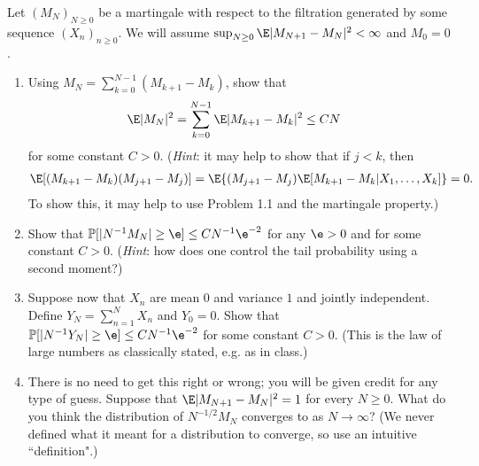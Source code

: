 \documentclass[12pt,reqno]{amsart}
\theoremstyle{definition}
\theoremstyle{remark}
\numberwithin{equation}{section}
\begin{document}
Let $(M_{N})_{N\geq0}$ be a martingale with respect to the filtration generated by some sequence $(X_{n})_{n\geq0}$. We will assume $\sup_{N\geq0}\E|M_{N+1}-M_{N}|^{2}<\infty$ and $M_{0}=0$.
\begin{enumerate}
\item Using $M_{N}=\sum_{k=0}^{N-1}(M_{k+1}-M_{k})$, show that 
%
\begin{align*}
\E|M_{N}|^{2}&=\sum_{k=0}^{N-1}\E|M_{k+1}-M_{k}|^{2}\leq CN
\end{align*}
%
for some constant $C>0$. (\emph{Hint}: it may help to show that if $j<k$, then 
%
\begin{align*}
\E[(M_{k+1}-M_{k})(M_{j+1}-M_{j})]=\E\{(M_{j+1}-M_{j})\E[M_{k+1}-M_{k}|X_{1},\ldots,X_{k}]\}=0.
\end{align*}
%
To show this, it may help to use Problem 1.1 and the martingale property.)
\item Show that $\mathbb{P}[|N^{-1}M_{N}|\geq\e]\leq CN^{-1}\e^{-2}$ for any $\e>0$ and for some constant $C>0$. (\emph{Hint}: how does one control the tail probability using a second moment?)
\item Suppose now that $X_{n}$ are mean $0$ and variance $1$ {\color{red}and jointly independent}. Define $Y_{N}=\sum_{n=1}^{N}X_{n}$ and $Y_{0}=0$. Show that $\mathbb{P}[|N^{-1}Y_{N}|\geq \e]\leq CN^{-1}\e^{-2}$ for some constant $C>0$. (This is the law of large numbers as classically stated, e.g. as in class.)
\item There is no need to get this right or wrong; you will be given credit for any type of guess. Suppose that $\E|M_{N+1}-M_{N}|^{2}=1$ for every $N\geq0$. What do you think the distribution of $N^{-1/2}M_{N}$ converges to as $N\to\infty$? (We never defined what it meant for a distribution to converge, so use an intuitive ``definition".) 
\end{enumerate}
\end{document}
